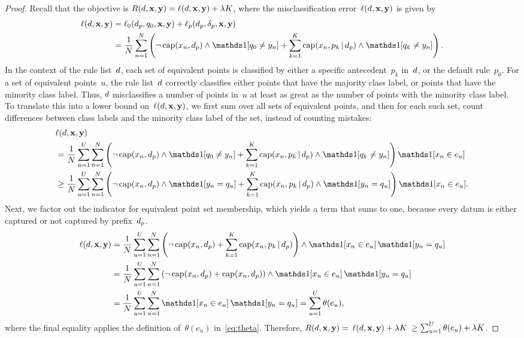 \begin{arxiv}
\begin{proof}
Recall that the objective is ${R({d}, \mathbf{x}, \mathbf{y}) = \ell({d}, \mathbf{x}, \mathbf{y}) + {\lambda} K}$,
where the misclassification error~${\ell({d}, \mathbf{x}, \mathbf{y})}$ is given by
\begin{align}
\Loss(\RL, \x, \y) &= \Loss_0(\Prefix, \Default, \x, \y) + \Loss_p(\Prefix, \Labels, \x, \y) \nn \\
&= \frac{1}{N} \sum_{n=1}^N \left( \neg\, \Cap(x_n, \Prefix) \wedge \one[q_0 \neq y_n]
   + \sum_{k=1}^K \Cap(x_n, p_k \given \Prefix) \wedge \one [q_k \neq y_n] \right).
\end{align}
In the context of the rule list~${d}$, each set of equivalent points is classified by
either a specific antecedent~$p_k$ in~${d}$, or the default rule~$p_0$.
%
For a set of equivalent points~$u$, the rule list~${d}$ correctly classifies either
points that have the majority class label, or points that have the minority class label.
%
Thus, ${d}$ misclassifies a number of points in~$u$ at least as great as
the number of points with the minority class label.
%
To translate this into a lower bound on~$\ell({d}, \mathbf{x}, \mathbf{y})$,
we first sum over all sets of equivalent points, and then for each such set,
count differences between class labels and the minority class label of the set,
instead of counting mistakes:
\begin{align}
&\Loss(\RL, \x, \y) \nn \\
&= \frac{1}{N} \sum_{u=1}^U \sum_{n=1}^N \left( \neg\, \Cap(x_n, \Prefix) \wedge \one[q_0 \neq y_n]
   + \sum_{k=1}^K \Cap(x_n, p_k \given \Prefix) \wedge \one [q_k \neq y_n] \right)
   \one [x_n \in e_u]  \nn \\
&\ge \frac{1}{N} \sum_{u=1}^U \sum_{n=1}^N \left( \neg\, \Cap(x_n, \Prefix) \wedge \one[y_n = q_u]
   + \sum_{k=1}^K \Cap(x_n, p_k \given \Prefix) \wedge \one [y_n = q_u] \right)
   \one [x_n \in e_u].
\label{eq:lb-equiv-pts}
\end{align}
Next, we factor out the indicator for equivalent point set membership,
which yields a term that sums to one, because every datum is either captured or
not captured by prefix~$d_p$.
\begin{align}
\Loss(\RL, \x, \y) &= \frac{1}{N} \sum_{u=1}^U \sum_{n=1}^N \left( \neg\, \Cap(x_n, \Prefix)
   + \sum_{k=1}^K \Cap(x_n, p_k \given \Prefix) \right)
   \wedge \one [x_n \in e_u]\, \one[y_n = q_u] \nn \\
&= \frac{1}{N} \sum_{u=1}^U \sum_{n=1}^N \left( \neg\, \Cap(x_n, \Prefix)
   + \Cap(x_n, \Prefix) \right)
   \wedge \one [x_n \in e_u]\, \one[y_n = q_u] \nn \\
&= \frac{1}{N} \sum_{u=1}^U \sum_{n=1}^N \one [ x_n \in e_u ]\, \one [ y_n = q_u ]
= \sum_{u=1}^U \theta(e_u),
\end{align}
where the final equality applies the definition of~$\theta(e_u)$ in~\eqref{eq:theta}.
%
Therefore, ${R({d}, \mathbf{x}, \mathbf{y}) =}$ ${\ell({d}, \mathbf{x}, \mathbf{y}) + {\lambda} K}$ ${\ge \sum_{u=1}^U \theta(e_u) + {\lambda} K}$.
\end{proof}
\end{arxiv}

